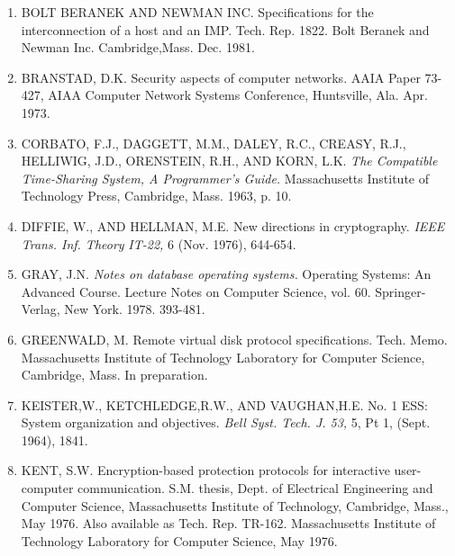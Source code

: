 \documentclass[a4paper,11pt,notitlepage,twoside,openright]{article}
\begin{document}
\begin{enumerate}
\def\labelenumi{\arabic{enumi}.}
\item

  BOLT BERANEK AND NEWMAN INC. Specifications for the interconnection of a
  host and an IMP. Tech. Rep. 1822. Bolt Beranek and Newman Inc.
  Cambridge,Mass. Dec. 1981.

\item

  BRANSTAD, D.K. Security aspects of computer networks. AAIA Paper 73-427,
  AIAA Computer Network Systems Conference, Huntsville, Ala. Apr. 1973.

\item

  CORBATO, F.J., DAGGETT, M.M., DALEY, R.C., CREASY, R.J., HELLIWIG,
  J.D., ORENSTEIN, R.H., AND KORN, L.K. \emph{The Compatible Time-Sharing System, A Programmer's
Guide.} Massachusetts
Institute of Technology Press, Cambridge, Mass. 1963, p. 10.

\item

  DIFFIE, W., AND HELLMAN, M.E. New directions in cryptography.
  \emph{IEEE Trans. Inf. Theory} \emph{IT-22,} 6 (Nov. 1976), 644-654.

\item

  GRAY, J.N. \emph{Notes on database operating systems.} Operating
  Systems: An Advanced Course. Lecture Notes on Computer Science, vol.
  60. Springer-Verlag, New York. 1978. 393-481.

\item

  GREENWALD, M. Remote virtual disk protocol specifications. Tech. Memo.
  Massachusetts Institute of Technology Laboratory for Computer
  Science, Cambridge, Mass. In preparation.

\item

  KEISTER,W., KETCHLEDGE,R.W., AND VAUGHAN,H.E. No. 1 ESS: System
  organization and objectives. \emph{Bell Syst. Tech. J. 53,} 5, Pt 1,
  (Sept. 1964), 1841.

\item

  KENT, S.W. Encryption-based protection protocols for interactive
  user-computer communication. S.M. thesis, Dept. of Electrical
  Engineering and Computer Science, Massachusetts Institute of
  Technology, Cambridge, Mass., May 1976. Also available as Tech. Rep.
  TR-162. Massachusetts Institute of Technology Laboratory for Computer
  Science, May 1976.


\end{enumerate}
\end{document}
